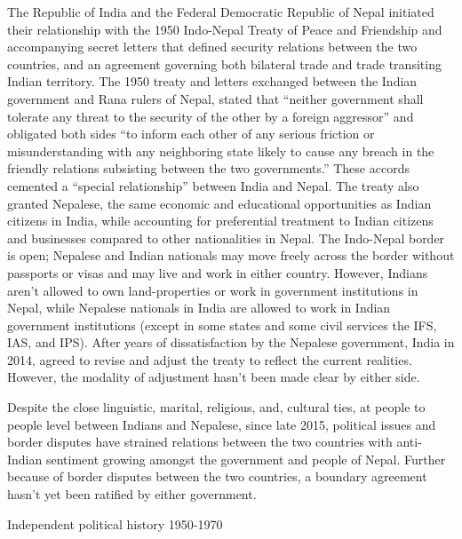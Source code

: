 \documentclass[
  openany]{book}
\begin{document}
The Republic of India and the Federal Democratic Republic of Nepal initiated their relationship with the 1950 Indo-Nepal Treaty of Peace and Friendship and accompanying secret letters that defined security relations between the two countries, and an agreement governing both bilateral trade and trade transiting Indian territory. The 1950 treaty and letters exchanged between the Indian government and Rana rulers of Nepal, stated that ``neither government shall tolerate any threat to the security of the other by a foreign aggressor'' and obligated both sides ``to inform each other of any serious friction or misunderstanding with any neighboring state likely to cause any breach in the friendly relations subsisting between the two governments.'' These accords cemented a ``special relationship'' between India and Nepal. The treaty also granted Nepalese, the same economic and educational opportunities as Indian citizens in India, while accounting for preferential treatment to Indian citizens and businesses compared to other nationalities in Nepal. The Indo-Nepal border is open; Nepalese and Indian nationals may move freely across the border without passports or visas and may live and work in either country. However, Indians aren't allowed to own land-properties or work in government institutions in Nepal, while Nepalese nationals in India are allowed to work in Indian government institutions (except in some states and some civil services the IFS, IAS, and IPS). After years of dissatisfaction by the Nepalese government, India in 2014, agreed to revise and adjust the treaty to reflect the current realities. However, the modality of adjustment hasn't been made clear by either side.

Despite the close linguistic, marital, religious, and, cultural ties, at people to people level between Indians and Nepalese, since late 2015, political issues and border disputes have strained relations between the two countries with anti-Indian sentiment growing amongst the government and people of Nepal. Further because of border disputes between the two countries, a boundary agreement hasn't yet been ratified by either government.

Independent political history
1950-1970
\end{document}
